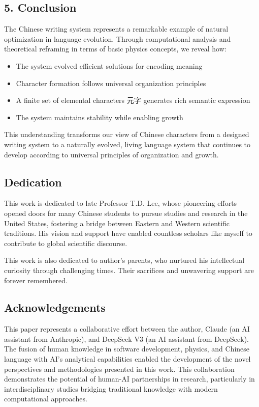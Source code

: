 \documentclass[
  11pt,
  letterpaper,
]{article}
\providecommand{\tightlist}{%
  \setlength{\itemsep}{0pt}\setlength{\parskip}{0pt}}
\begin{document}
\subsection{5. Conclusion}\label{conclusion}

The Chinese writing system represents a remarkable example of natural
optimization in language evolution. Through computational analysis and
theoretical reframing in terms of basic physics concepts, we reveal how:

\begin{itemize}
\tightlist
\item
  The system evolved efficient solutions for encoding meaning
\item
  Character formation follows universal organization principles
\item
  A finite set of elemental characters 元字 generates rich semantic
  expression
\item
  The system maintains stability while enabling growth
\end{itemize}

This understanding transforms our view of Chinese characters from a
designed writing system to a naturally evolved, living language system
that continues to develop according to universal principles of
organization and growth.

\subsection{Dedication}\label{dedication}

This work is dedicated to late Professor T.D. Lee, whose pioneering
efforts opened doors for many Chinese students to pursue studies and
research in the United States, fostering a bridge between Eastern and
Western scientific traditions. His vision and support have enabled
countless scholars like myself to contribute to global scientific
discourse.

This work is also dedicated to author's parents, who nurtured his
intellectual curiosity through challenging times. Their sacrifices and
unwavering support are forever remembered.

\subsection{Acknowledgements}\label{acknowledgements}

This paper represents a collaborative effort between the author, Claude
(an AI assistant from Anthropic), and DeepSeek V3 (an AI assistant from
DeepSeek). The fusion of human knowledge in software development,
physics, and Chinese language with AI's analytical capabilities enabled
the development of the novel perspectives and methodologies presented in
this work. This collaboration demonstrates the potential of human-AI
partnerships in research, particularly in interdisciplinary studies
bridging traditional knowledge with modern computational approaches.
\end{document}
